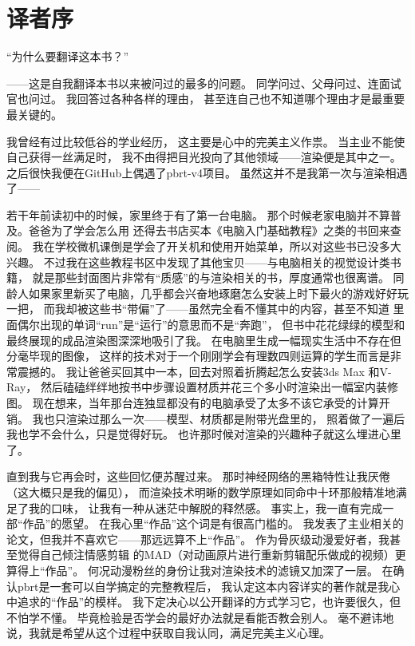 \chapter{译者序}\label{chap:译者序}

“为什么要翻译这本书？”

——这是自我翻译本书以来被问过的最多的问题。
同学问过、父母问过、连面试官也问过。
我回答过各种各样的理由，
甚至连自己也不知道哪个理由才是最重要最关键的。

我曾经有过比较低谷的学业经历，
这主要是心中的完美主义作祟。
当主业不能使自己获得一丝满足时，
我不由得把目光投向了其他领域——渲染便是其中之一。
之后很快我便在GitHub上偶遇了pbrt-v4项目。
虽然这并不是我第一次与渲染相遇了——

若干年前读初中的时候，家里终于有了第一台电脑。
那个时候老家电脑并不算普及。爸爸为了学会怎么用
还得去书店买本《电脑入门基础教程》之类的书回来查阅。
我在学校微机课倒是学会了开关机和使用开始菜单，所以对这些书已没多大兴趣。
不过我在这些教程书区中发现了其他宝贝——与电脑相关的视觉设计类书籍，
就是那些封面图片非常有“质感”的与渲染相关的书，厚度通常也很离谱。
同龄人如果家里新买了电脑，几乎都会兴奋地琢磨怎么安装上时下最火的游戏好好玩一把，
而我却被这些书“带偏”了——虽然完全看不懂其中的内容，甚至不知道
里面偶尔出现的单词“run”是“运行”的意思而不是“奔跑”，
但书中花花绿绿的模型和最终展现的成品渲染图深深地吸引了我。
在电脑里生成一幅现实生活中不存在但分毫毕现的图像，
这样的技术对于一个刚刚学会有理数四则运算的学生而言是非常震撼的。
我让爸爸买回其中一本，回去对照着折腾起怎么安装3ds Max\textsuperscript{\textregistered}
和V-Ray\textsuperscript{\textregistered}，
然后磕磕绊绊地按书中步骤设置材质并花三个多小时渲染出一幅室内装修图。
现在想来，当年那台连独显都没有的电脑承受了太多不该它承受的计算开销。
我也只渲染过那么一次——模型、材质都是附带光盘里的，
照着做了一遍后我也学不会什么，只是觉得好玩。
也许那时候对渲染的兴趣种子就这么埋进心里了。

直到我与它再会时，这些回忆便苏醒过来。
那时神经网络的黑箱特性让我厌倦（这大概只是我的偏见），
而渲染技术明晰的数学原理如同命中十环那般精准地满足了我的口味，
让我有一种从迷茫中解脱的释然感。
事实上，我一直有完成一部“作品”的愿望。
在我心里“作品”这个词是有很高门槛的。
我发表了主业相关的论文，但我并不喜欢它——那远远算不上“作品”。
作为骨灰级动漫爱好者，我甚至觉得自己倾注情感剪辑
的MAD（对动画原片进行重新剪辑配乐做成的视频）更算得上“作品”。
何况动漫粉丝的身份让我对渲染技术的滤镜又加深了一层。
在确认pbrt是一套可以自学搞定的完整教程后，
我认定这本内容详实的著作就是我心中追求的“作品”的模样。
我下定决心以公开翻译的方式学习它，也许要很久，但不怕学不懂。
毕竟检验是否学会的最好办法就是看能否教会别人。
毫不避讳地说，我就是希望从这个过程中获取自我认同，满足完美主义心理。

